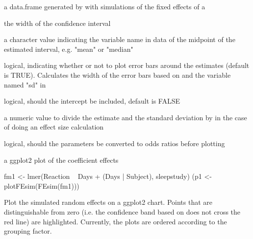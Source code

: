 \documentclass[letterpaper]{book}
\begin{document}
\begin{Arguments}
\begin{ldescription}
\item[\code{data}] a data.frame generated by  with simulations of
the fixed effects of a 

\item[\code{level}] the width of the confidence interval

\item[\code{stat}] a character value indicating the variable name in data of the
midpoint of the estimated interval, e.g. "mean" or "median"

\item[\code{sd}] logical, indicating whether or not to plot error bars around
the estimates (default is TRUE). Calculates the width of the error bars
based on  and the variable named "sd" in 

\item[\code{intercept}] logical, should the intercept be included, default is FALSE

\item[\code{sigmaScale}] a numeric value to divide the estimate and the standard
deviation by in the case of doing an effect size calculation

\item[\code{oddsRatio}] logical, should the parameters be converted to odds ratios
before plotting
\end{ldescription}
\end{Arguments}
%
\begin{Value}
a ggplot2 plot of the coefficient effects
\end{Value}
%
\begin{Examples}
\begin{ExampleCode}
 fm1 <- lmer(Reaction ~ Days + (Days | Subject), sleepstudy)
 (p1 <- plotFEsim(FEsim(fm1)))
\end{ExampleCode}
\end{Examples}
%
\begin{Description}\relax
Plot the simulated random effects on a ggplot2 chart. Points that
are distinguishable from zero (i.e. the confidence band based on 
does not cross the red line) are highlighted. Currently, the plots are ordered
according to the grouping factor.
\end{Description}
\end{document}
